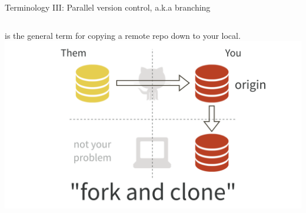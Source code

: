\documentclass[ignorenonframetext, 10pt, aspectratio=169]{beamer}
\begin{document}
\begin{frame}{Terminology III: Parallel version control, a.k.a branching}
\begin{columns}[T]
\begin{column}{0.25\textwidth}
is the general term for copying a remote repo down to your local.\\

\includegraphics[width = 1.25\linewidth]{fork-and-clone.png}
\end{column}

\end{columns}
\end{frame}


\end{document}
